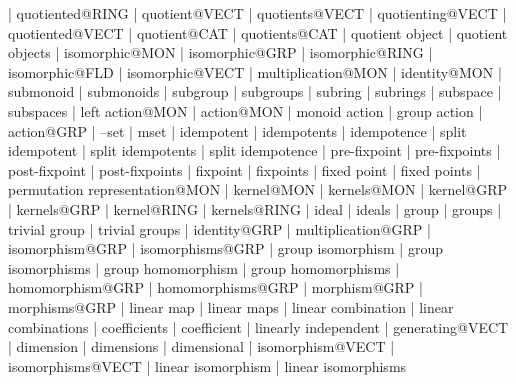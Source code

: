     |   quotiented@RING
    |   quotient@VECT
    |   quotients@VECT
    |   quotienting@VECT
    |   quotiented@VECT
    |   quotient@CAT
    |   quotients@CAT
    |   quotient object
    |   quotient objects
    |   isomorphic@MON
    |   isomorphic@GRP
    |   isomorphic@RING
    |   isomorphic@FLD
    |   isomorphic@VECT
    |   multiplication@MON
    |   identity@MON
    |   submonoid
    |   submonoids
    |   subgroup
    |   subgroups
    |   subring
    |   subrings
    |   subspace
    |   subspaces
    |   left action@MON
    |   action@MON
    |   monoid action
    |   group action
    |   action@GRP
    |   --set
    |   mset
    |   idempotent
    |   idempotents
    |   idempotence 
    |   split idempotent
    |   split idempotents
    |   split idempotence 
    |   pre-fixpoint
    |   pre-fixpoints
    |   post-fixpoint
    |   post-fixpoints
    |   fixpoint
    |   fixpoints
    |   fixed point
    |   fixed points
    |   permutation representation@MON
    |   kernel@MON
    |   kernels@MON
    |   kernel@GRP
    |   kernels@GRP
    |   kernel@RING
    |   kernels@RING
    |   ideal
    |   ideals
    |   group
    |   groups
    |   trivial group
    |   trivial groups
    |   identity@GRP
    |   multiplication@GRP
    |   isomorphism@GRP
    |   isomorphisms@GRP
    |   group isomorphism
    |   group isomorphisms
    |   group homomorphism
    |   group homomorphisms
    |   homomorphism@GRP
    |   homomorphisms@GRP
    |   morphism@GRP
    |   morphisms@GRP
    |   linear map
    |   linear maps
    |   linear combination
    |   linear combinations
    |   coefficients
    |   coefficient
    |   linearly independent
    |   generating@VECT
    |   dimension
    |   dimensions
    |   dimensional
    |   isomorphism@VECT
    |   isomorphisms@VECT
    |   linear isomorphism
    |   linear isomorphisms
